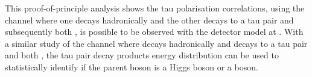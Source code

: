 This proof-of-principle analysis shows the tau polarisation correlations, using the \eeZZ channel where one \PZ decays hadronically and the other \PZ decays to a tau pair and subsequently both \tauToPion,  is possible to be observed with the \ILD detector model at . With a similar study of the \eeHZ channel where \PH decays hadronically and \PZ decays to a tau pair and both \tauToPion,  the  tau pair decay products energy distribution can be used to statistically identify if the parent boson is a Higgs boson or a \PZ boson.






